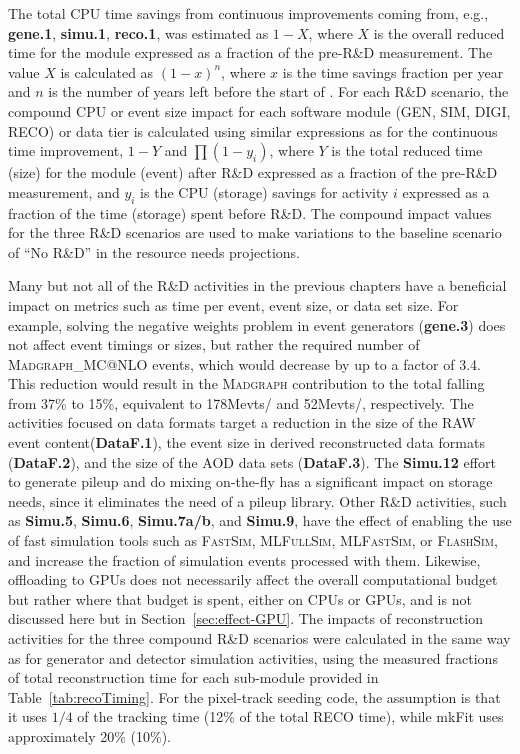 The total \gls{CPU} time savings from continuous improvements coming from, e.g., \textbf{gene.1}, \textbf{simu.1}, \textbf{reco.1}, was estimated as $1-X$, where $X$ is the overall reduced time for the module expressed as a fraction of the pre-R\&D measurement. The value $X$ is calculated as $(1-x)^n$, where $x$ is the time savings fraction per year and $n$ is the number of years left before the start of \RunFour. For each R\&D scenario, the compound \gls{CPU} or event size impact for each software module (\gls{GEN}, \gls{SIM}, \gls{DIGI}, \gls{RECO}) or data tier is calculated using similar expressions as for the continuous time improvement, $1-Y$ and $\prod(1-y_i)$, where $Y$ is the total reduced time (size) for the module (event) after R\&D expressed as a fraction of the pre-R\&D measurement, and $y_i$ is the \gls{CPU} (storage) savings for activity $i$ expressed as a fraction of the time (storage) spent before R\&D. The compound impact values for the three R\&D scenarios are used to make variations to the baseline scenario of ``No R\&D'' in the resource needs projections.

Many but not all of the R\&D activities in the previous chapters have a beneficial impact on metrics such as time per event, event size, or data set size. For example, solving the negative weights problem in event generators (\textbf{gene.3}) does not affect event timings or sizes, but rather the required number of \textsc{Madgraph\_MC@NLO} events, which would decrease by up to a factor of 3.4. This reduction would result in the \textsc{Madgraph} contribution to the total falling from 37\% to 15\%, equivalent to 178\unit{Mevts/\fbinv} and 52\unit{Mevts/\fbinv}, respectively. 
The activities focused on data formats target a reduction in the size of the \gls{RAW} event content(\textbf{DataF.1}), the event size in derived reconstructed data formats (\textbf{DataF.2}), and the size of the AOD data sets (\textbf{DataF.3}). The \textbf{Simu.12} effort to generate pileup and do mixing on-the-fly has a significant impact on storage needs, since it eliminates the need of a pileup library.
Other R\&D activities, such as \textbf{Simu.5}, \textbf{Simu.6}, \textbf{Simu.7a/b}, and \textbf{Simu.9}, have the effect of enabling the use of fast simulation tools such as \textsc{FastSim}, \textsc{MLFullSim}, \textsc{MLFastSim}, or \textsc{FlashSim}, and increase the fraction of simulation events processed with them. Likewise, offloading to \glspl{GPU} does not necessarily affect the overall computational budget but rather where that budget is spent, either on \glspl{CPU} or \glspl{GPU}, and is not discussed here but in Section~\ref{sec:effect-GPU}. 
The impacts of reconstruction activities for the three compound R\&D scenarios were calculated in the same way as for generator and detector simulation activities, using the measured fractions of total reconstruction time for each sub-module provided in Table~\ref{tab:recoTiming}. For the pixel-track seeding code, the assumption is that it uses $1/4$ of the tracking time (12\% of the total \gls{RECO} time), while mkFit uses approximately 20\% (10\%).

